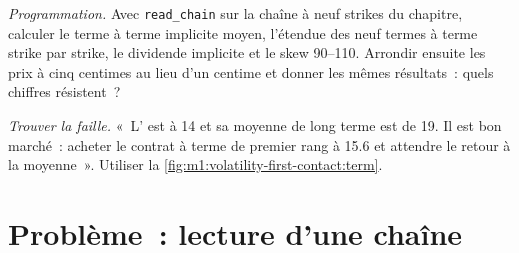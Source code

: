 \begin{exercise}[$\star\star\star$]\label{exo:m1:volatility-first-contact:7}
\emph{Programmation.} Avec \texttt{read\_chain} sur la chaîne à neuf strikes du chapitre,
calculer le terme à terme implicite moyen, l'étendue des neuf termes à terme strike par strike,
le dividende implicite et le skew 90--110. Arrondir ensuite les prix à cinq centimes au lieu d'un centime
et donner les mêmes résultats~: quels chiffres résistent~?
\end{exercise}

\begin{exercise}[$\star\star\star$]\label{exo:m1:volatility-first-contact:8}
\emph{Trouver la faille.} «~L' est à 14 et sa moyenne de long terme
est de 19. Il est bon marché~: acheter le contrat à terme de premier rang à 15.6 et attendre le retour
à la moyenne~». Utiliser la \cref{fig:m1:volatility-first-contact:term}.
\end{exercise}

\section{Problème~: lecture d'une chaîne}

